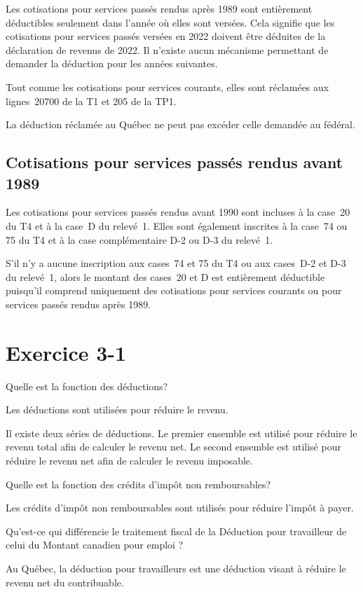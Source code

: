 Les cotisations pour services passés rendus après 1989 sont entièrement déductibles seulement dans l'année où elles sont versées. Cela signifie que les cotisations pour services passés versées en 2022 doivent être déduites de la déclaration de revenus de 2022. Il n'existe aucun mécanisme permettant de demander la déduction pour les années suivantes.

Tout comme les cotisations pour services courants, elles sont réclamées aux lignes~20700 de la T1 et 205 de la TP1.

La déduction réclamée au Québec ne peut pas excéder celle demandée au fédéral.


\subsection{Cotisations pour services passés rendus avant 1989}
Les cotisations pour services passés rendus avant 1990 sont incluses à la case~20 du T4 et à la case~D du relevé~1. Elles sont également inscrites à la case~74 ou 75 du T4 et à la case complémentaire D-2 ou D-3 du relevé~1.

S'il n'y a aucune inscription aux cases~74 et 75 du T4 ou aux cases~D-2 et D-3 du relevé~1, alors le montant des cases~20 et D est entièrement déductible puisqu'il comprend uniquement des cotisations pour services courants ou pour services passés rendus après 1989.



\section{Exercice 3-1}
\setcounter{question}{0}
\begin{question}
	Quelle est la fonction des déductions?
\end{question}
Les déductions sont utilisées pour réduire le revenu.

Il existe deux séries de déductions. Le premier ensemble est utilisé pour réduire le revenu total afin de calculer le revenu net. Le second ensemble est utilisé pour réduire le revenu net afin de calculer le revenu imposable.

\begin{question}
	Quelle est la fonction des crédits d'impôt non remboursables?
\end{question}
Les crédits d'impôt non remboursables sont utilisés pour réduire l'impôt à payer.

\begin{question}
	Qu'est-ce qui différencie le traitement fiscal de la \og Déduction pour travailleur \fg{} de celui du \og Montant canadien pour emploi \fg{}? 
\end{question}
Au Québec, la déduction pour travailleurs est une déduction visant à réduire le revenu net du contribuable.

